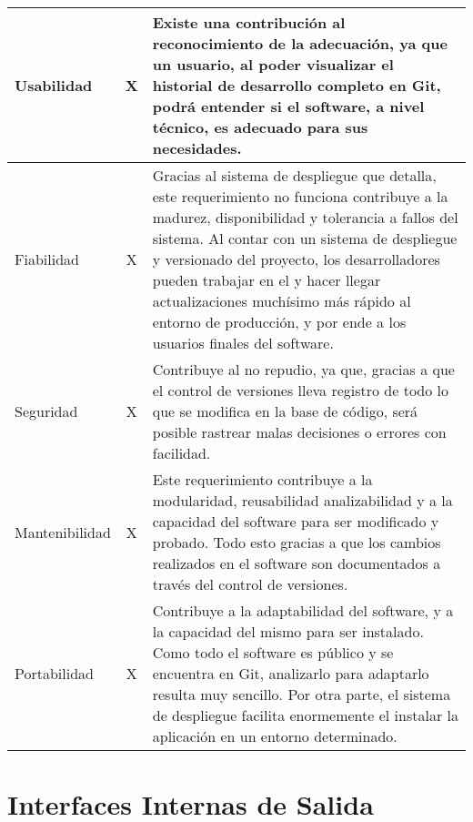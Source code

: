 \begin{center}
\begin{tabular}{ | p{2cm}| p{8cm} | p{5cm} |}
    \multicolumn{1}{|p{3.5cm}|}{\nohyphens{Usabilidad}} & \multicolumn{1}{|c|}{X} & \multicolumn{1}{|p{10cm}|}{Existe una contribución al reconocimiento de la adecuación, ya que un usuario, al poder visualizar el historial de desarrollo completo en Git, podrá entender si el software, a nivel técnico, es adecuado para sus necesidades.} \\ \hline
    
    \multicolumn{1}{|p{3.5cm}|}{\nohyphens{Fiabilidad}} & \multicolumn{1}{|c|}{X} & \multicolumn{1}{|p{10cm}|}{Gracias al sistema de despliegue que detalla, este requerimiento no funciona contribuye a la madurez, disponibilidad y tolerancia a fallos del sistema. Al contar con un sistema de despliegue y versionado del proyecto, los desarrolladores pueden trabajar en el y hacer llegar actualizaciones muchísimo más rápido al entorno de producción, y por ende a los usuarios finales del software.} \\ \hline
    
    \multicolumn{1}{|p{3.5cm}|}{\nohyphens{Seguridad}} & \multicolumn{1}{|c|}{X} & \multicolumn{1}{|p{10cm}|}{Contribuye al no repudio, ya que, gracias a que el control de versiones lleva registro de todo lo que se modifica en la base de código, será posible rastrear malas decisiones o errores con facilidad.} \\ \hline
    
    \multicolumn{1}{|p{3.5cm}|}{\nohyphens{Mantenibilidad}} & \multicolumn{1}{|c|}{X} & \multicolumn{1}{|p{10cm}|}{Este requerimiento contribuye a la modularidad, reusabilidad analizabilidad y a la capacidad del software para ser modificado y probado. Todo esto gracias a que los cambios realizados en el software son documentados a través del control de versiones.} \\ \hline
    
    \multicolumn{1}{|p{3.5cm}|}{\nohyphens{Portabilidad}} & \multicolumn{1}{|c|}{X} & \multicolumn{1}{|p{10cm}|}{Contribuye a la adaptabilidad del software, y a la capacidad del mismo para ser instalado. Como todo el software es público y se encuentra en Git, analizarlo para adaptarlo resulta muy sencillo. Por otra parte, el sistema de despliegue facilita enormemente el instalar la aplicación en un entorno determinado.} \\
    \hline
  \end{tabular}
\end{center}

\section{Interfaces Internas de Salida}

